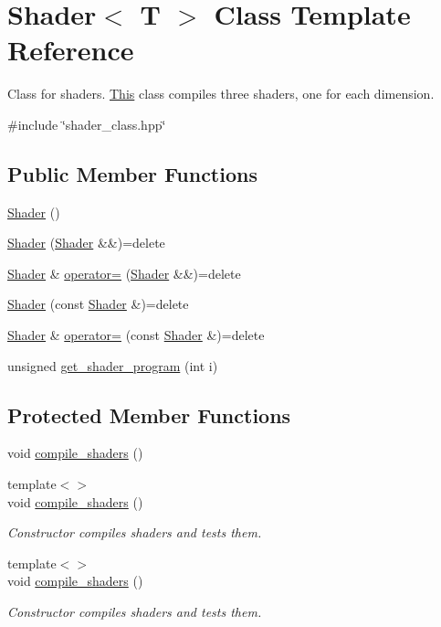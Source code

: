 \hypertarget{classShader}{}\section{Shader$<$ T $>$ Class Template Reference}
\label{classShader}


Class for shaders. \mbox{\hyperlink{classThis}{This}} class compiles three shaders, one for each dimension.  




{\ttfamily \#include \char`\"{}shader\+\_\+class.\+hpp\char`\"{}}

\subsection*{Public Member Functions}
\begin{DoxyCompactItemize}
\item 
\mbox{\hyperlink{classShader_a02faa1d7140779d7a24e06d1aff58d68}{Shader}} ()
\item 
\mbox{\hyperlink{classShader_a7e30078f161d1c9f48a7b3921c01f816}{Shader}} (\mbox{\hyperlink{classShader}{Shader}} \&\&)=delete
\item 
\mbox{\hyperlink{classShader}{Shader}} \& \mbox{\hyperlink{classShader_a3b92fece66095389581a2bf6b3124657}{operator=}} (\mbox{\hyperlink{classShader}{Shader}} \&\&)=delete
\item 
\mbox{\hyperlink{classShader_a49b2a448a00b5e1413c17501f8873cca}{Shader}} (const \mbox{\hyperlink{classShader}{Shader}} \&)=delete
\item 
\mbox{\hyperlink{classShader}{Shader}} \& \mbox{\hyperlink{classShader_a58f724fecccecdb1633e08ce0258da37}{operator=}} (const \mbox{\hyperlink{classShader}{Shader}} \&)=delete
\item 
unsigned \mbox{\hyperlink{classShader_a2c19b216850480109f9d5f7ed6ab6aa6}{get\+\_\+shader\+\_\+program}} (int i)
\end{DoxyCompactItemize}
\subsection*{Protected Member Functions}
\begin{DoxyCompactItemize}
\item 
void \mbox{\hyperlink{classShader_a1176d69a08aef6df3b7850104871a839}{compile\+\_\+shaders}} ()
\item 
{\footnotesize template$<$$>$ }\\void \mbox{\hyperlink{classShader_a3ffd553eceda4e9d5a1d8b4a5a157659}{compile\+\_\+shaders}} ()
\begin{DoxyCompactList}\small\item\em Constructor compiles shaders and tests them. \end{DoxyCompactList}\item 
{\footnotesize template$<$$>$ }\\void \mbox{\hyperlink{classShader_ae486635d367b6054482c56747ed74846}{compile\+\_\+shaders}} ()
\begin{DoxyCompactList}\small\item\em Constructor compiles shaders and tests them. \end{DoxyCompactList}\end{DoxyCompactItemize}
